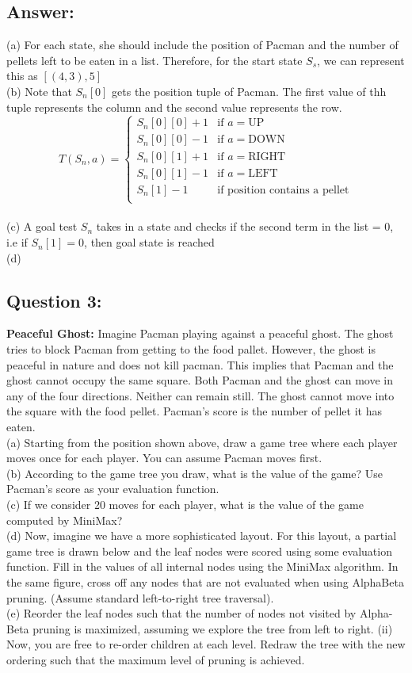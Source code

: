 \documentclass{article}
\begin{document}
\subsection*{Answer:}
(a) For each state, she should include the position of Pacman and the number of pellets left to be eaten in a list. Therefore, for the start state $S_s$, we can represent this as $[(4,3), 5]$
\\
(b) Note that $S_n[0]$ gets the position tuple of Pacman. The first value of thh tuple represents the column and the second value represents the row.
\[T(S_n, a) =
\begin{cases}
    S_n[0][0] + 1 & \text{if } a = \text{UP} \\
    S_n[0][0] - 1 & \text{if } a = \text{DOWN} \\
    S_n[0][1] + 1 & \text{if } a = \text{RIGHT} \\
    S_n[0][1] - 1 & \text{if } a = \text{LEFT} \\
    S_n[1] - 1 & \text{if position contains a pellet} \\
\end{cases}
\]
\\
(c) A goal test $S_n$ takes in a state and checks if the second term in the list = 0, i.e if $S_n[1] = 0$, then goal state is reached
\\
(d)

\subsection*{Question 3:}
\textbf{Peaceful Ghost:} Imagine Pacman playing against a peaceful ghost. The ghost
tries to block Pacman from getting to the food pallet. However, the ghost is peaceful in
nature and does not kill pacman. This implies that Pacman and the ghost cannot occupy
the same square. Both Pacman and the ghost can move in any of the four directions.
Neither can remain still. The ghost cannot move into the square with the food pellet.
Pacman’s score is the number of pellet it has eaten.
\\
(a) Starting from the position shown above, draw a game tree where each
player moves once for each player. You can assume Pacman moves first.
\\
(b) According to the game tree you draw, what is the value of the game? Use
Pacman’s score as your evaluation function.
\\
(c) If we consider 20 moves for each player, what is the value of the game
computed by MiniMax?
\\
(d) Now, imagine we have a more sophisticated layout. For this layout, a
partial game tree is drawn below and the leaf nodes were scored using some evaluation function. Fill in the values of all internal nodes using the MiniMax algorithm. In the same figure, cross off any nodes that are not evaluated when using AlphaBeta pruning. (Assume standard left-to-right tree traversal).
\\
(e) Reorder the leaf nodes such that the number of nodes not visited by Alpha-Beta pruning is maximized, assuming we explore the tree from left to right.
(ii) Now, you are free to re-order children at each level. Redraw the tree with the new ordering such that the maximum level of pruning is achieved.
\end{document}
